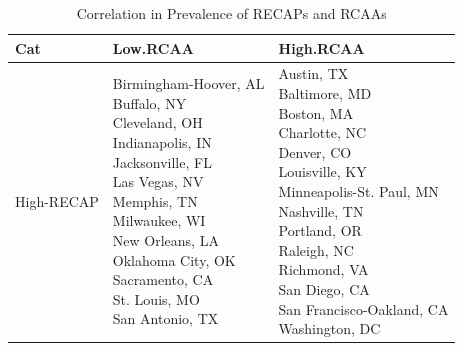 \documentclass[11pt,]{article}
\begin{document}
\begin{table}[t]

\caption{\label{tab:table11}Correlation in Prevalence of RECAPs and RCAAs}
\centering
\fontsize{7}{9}\selectfont
\begin{tabular}{l|l|l}
\hline
Cat & Low.RCAA & High.RCAA\\
\hline
High-RECAP & \makecell[l]{Birmingham-Hoover, AL\\                 Buffalo, NY\\                 Cleveland, OH\\                 Indianapolis, IN\\                 Jacksonville, FL\\                 Las Vegas, NV\\                 Memphis, TN\\                 Milwaukee, WI\\                 New Orleans, LA\\                 Oklahoma City, OK\\                 Sacramento, CA\\                 St. Louis, MO\\                 San Antonio, TX} & \makecell[l]{Austin, TX\\                 Baltimore, MD\\                 Boston, MA\\                 Charlotte, NC\\                 Denver, CO\\                 Louisville, KY\\                 Minneapolis-St. Paul, MN\\                 Nashville, TN\\                 Portland, OR\\                 Raleigh, NC\\                 Richmond, VA\\                 San Diego, CA\\                 San Francisco-Oakland, CA\\                 Washington, DC}\\
\hline

\end{tabular}
\end{table}
\end{document}
